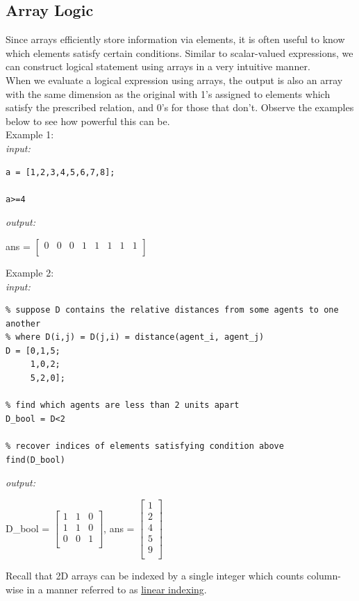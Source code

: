 \documentclass[../MATLAB_Primer.tex]{subfiles}
\begin{document}
\subsection{Array Logic}
Since arrays efficiently store information via elements, it is often useful to know which elements satisfy certain conditions. Similar to scalar-valued expressions, we can construct logical statement using arrays in a very intuitive manner.\\

When we evaluate a logical expression using arrays, the output is also an array with the same dimension as the original with 1's assigned to elements which satisfy the prescribed relation, and 0's for those that don't.  Observe the examples below to see how powerful this can be.\\ 

Example 1:\\

\textit{input:}
\begin{lstlisting}
a = [1,2,3,4,5,6,7,8];

a>=4
\end{lstlisting}
\textit{output:}
\begin{center}
    ans = 
    $\begin{bmatrix}
    0 & 0 & 0 & 1 & 1 & 1 & 1 & 1\\
    \end{bmatrix}$
\end{center}

Example 2:\\

\textit{input:}
\begin{lstlisting}
% suppose D contains the relative distances from some agents to one another 
% where D(i,j) = D(j,i) = distance(agent_i, agent_j) 
D = [0,1,5; 
     1,0,2; 
     5,2,0];

% find which agents are less than 2 units apart
D_bool = D<2

% recover indices of elements satisfying condition above
find(D_bool)
\end{lstlisting}
\textit{output:}
\begin{center}
    D\_bool = 
    $\begin{bmatrix}
    1 & 1 & 0\\
    1 & 1 & 0\\
    0 & 0 & 1\\
    \end{bmatrix}$,\quad 
    ans = 
    $\begin{bmatrix}
    1\\2\\4\\5\\9\\
    \end{bmatrix}$
\end{center}
Recall that 2D arrays can be indexed by a single integer which counts column-wise in a manner referred to as \href{https://www.mathworks.com/help/matlab/math/array-indexing.html#MatrixIndexingExample-2}{\color{blue}linear indexing}.\\
\end{document}
